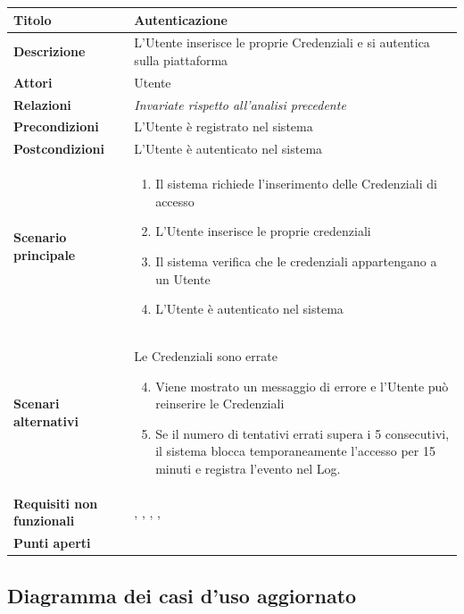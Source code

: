 \documentclass[12pt,a4paper]{report}
\let\oldhyperref\hyperref
\renewcommand{\hyperref}[2][]{\oldhyperref[#1]{\dotuline{#2}}}
\begin{document}
\begin{tabularx}{\textwidth}{|X|X|}
    \hline
    \rowcolor{studyColor} \textbf{Titolo} & \textbf{Autenticazione} \\ \hline
    \endhead
    \textbf{Descrizione} & L'Utente inserisce le proprie Credenziali e si autentica sulla piattaforma \\ \hline
    \textbf{Attori} & Utente \\ \hline
    \textbf{Relazioni} & \textit{Invariate rispetto all'analisi precedente} \\ \hline
    \textbf{Precondizioni} & L'Utente è registrato nel sistema \\ \hline
    \textbf{Postcondizioni} & L'Utente è autenticato nel sistema \\ \hline
    \textbf{Scenario principale} & 
        \begin{enumerate}[nosep, leftmargin=*]
            \item Il sistema richiede l'inserimento delle Credenziali di accesso
            \item L'Utente inserisce le proprie credenziali
            \item Il sistema verifica che le credenziali appartengano a un Utente
            \item L'Utente è autenticato nel sistema
        \end{enumerate} \\ \hline
    \textbf{Scenari alternativi} & 
        Le Credenziali sono errate
        \begin{enumerate}[nosep, leftmargin=*]
            \setcounter{enumi}{3}
            \item Viene mostrato un messaggio di errore e l'Utente può reinserire le Credenziali
            \item Se il numero di tentativi errati supera i 5 consecutivi, il sistema blocca temporaneamente l'accesso per 15 minuti e registra l'evento nel Log.
        \end{enumerate} \\ \hline
    \textbf{Requisiti non funzionali} & \hyperref[R03N]{R03N}, \hyperref[R07N]{R07N}, \hyperref[R09N]{R09N}, \hyperref[R10N]{R10N}, \hyperref[R11N]{R11N} \\ \hline
    \textbf{Punti aperti} & \\ \hline
\end{tabularx}

\subsection{Diagramma dei casi d'uso aggiornato}
\end{document}
